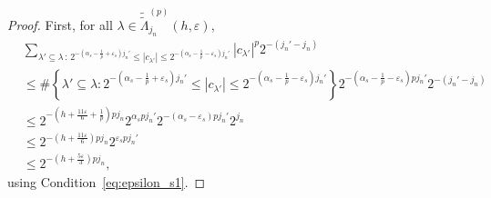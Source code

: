 \documentclass[a4paper,11pt,oneside]{article}
\newcommand{\modu}[1]{\left\vert{#1}\right\vert}
\theoremstyle{definition}
\theoremstyle{plain}
\begin{document}
\begin{proof}
    First, for all $\lambda\in \widetilde{\widetilde{\Lambda}}_{j_n}^{(p)}(h,\varepsilon)$, 
    \begin{align*}
        & \sum_{\lambda'\subseteq\lambda \,:\, 2^{-\left(\alpha_s-\frac{1}{p}+\varepsilon_s\right)j_n'} \leq \modu{c_{\lambda'}} \leq 2^{-\left(\alpha_s-\frac{1}{p}-\varepsilon_s\right)j_n'}} \modu{c_{\lambda'}}^p2^{-(j_n'-j_n)} \\
        & \leq \#\left\{\lambda'\subseteq\lambda :2^{-\left(\alpha_s-\frac{1}{p}+\varepsilon_s\right)j_n'} \leq \modu{c_{\lambda'}} \leq 2^{-\left(\alpha_s-\frac{1}{p}-\varepsilon_s\right)j_n'}\right\} 2^{-\left(\alpha_s-\frac{1}{p}-\varepsilon_s\right)pj_n'}2^{-(j_n'-j_n)} \\
        & \leq 2^{-\left(h+\frac{11\varepsilon}{6}+\frac{1}{p}\right)pj_n}2^{\alpha_spj_n'}2^{-(\alpha_s-\varepsilon_s)pj_n'}2^{j_n} \\
        & \leq 2^{-\left(h+\frac{11\varepsilon}{6}\right)pj_n}2^{\varepsilon_spj_n'} \\
        & \leq 2^{-\left(h+\frac{5\varepsilon}{3}\right)pj_n},
    \end{align*}
    using Condition~\eqref{eq:epsilon_s1}.


\end{proof}
\end{document}
